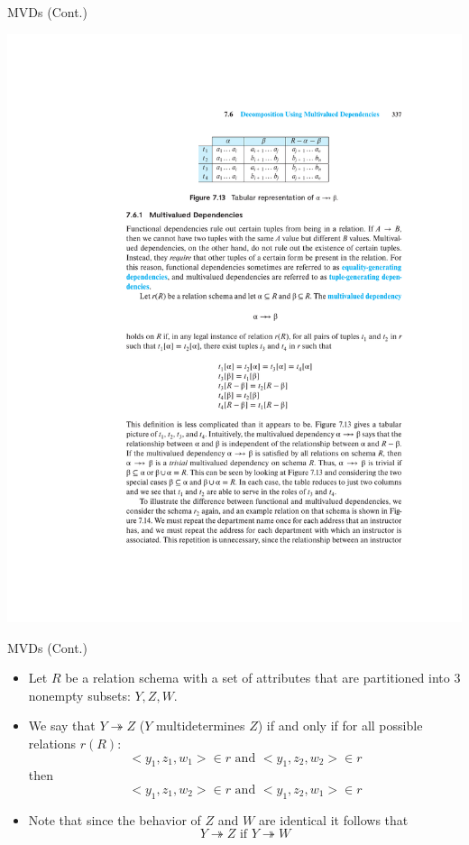 \documentclass{beamer}
\begin{document}
\begin{frame}{MVDs (Cont.)}
    \begin{center}
        \includegraphics[width=\textwidth, trim={7.5cm 19.75cm 5cm 4.5cm}, clip]{figures/p337_tabular}
    \end{center}
\end{frame}

\begin{frame}{MVDs (Cont.)}
    \begin{itemize}
        \item Let $R$ be a relation schema with a set of attributes that are partitioned into 3 nonempty subsets: $Y, Z, W$.
        \item We say that $Y \twoheadrightarrow Z$ ($Y$ multidetermines $Z$) if and only if for all possible relations $r(R)$:
            \begin{equation*}
                < y_1, z_1, w_1 > \in r \text{ and } < y_1, z_2, w_2 > \in r
            \end{equation*}
            then
            \begin{equation*}
                < y_1, z_1, w_2 > \in r \text{ and } < y_1, z_2, w_1 > \in r
            \end{equation*}
        \item Note that since the behavior of $Z$ and $W$ are identical it follows that
            \begin{equation*}
                Y \twoheadrightarrow Z \text{ if } Y \twoheadrightarrow W
            \end{equation*}
    \end{itemize}

\end{frame}
\end{document}
